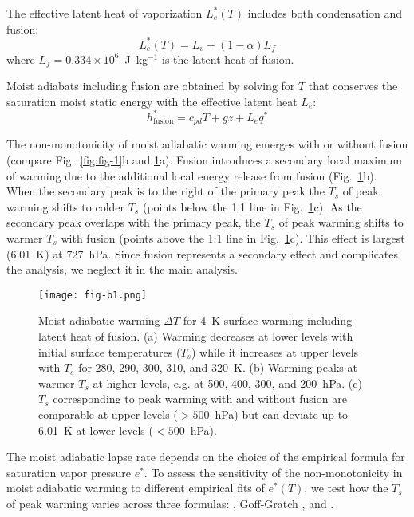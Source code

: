\documentclass[]{ametsocV6.1}
\begin{document}
The effective latent heat of vaporization $L_e^*(T)$ includes both condensation and fusion:
\begin{equation}
L_e^*(T) = L_v + (1-\alpha) L_f
\end{equation}
where $L_f = 0.334 \times 10^6$~J~kg$^{-1}$ is the latent heat of fusion.

Moist adiabats including fusion are obtained by solving for $T$ that conserves the saturation moist static energy with the effective latent heat $L_e$:
\begin{equation}
    h_\mathrm{fusion}^* = c_{pd}T + gz + L_e q^*  \label{eq:mse_fusion}
\end{equation}

The non-monotonicity of moist adiabatic warming emerges with or without fusion (compare Fig.~\ref{fig:fig-1}b and \ref{fig:fig-b1}a). Fusion introduces a secondary local maximum of warming due to the additional local energy release from fusion (Fig.~\ref{fig:fig-b1}b). When the secondary peak is to the right of the primary peak the $T_s$ of peak warming shifts to colder $T_s$ (points below the 1:1 line in Fig.~\ref{fig:fig-b1}c). As the secondary peak overlaps with the primary peak, the $T_s$ of peak warming shifts to warmer $T_s$ with fusion (points above the 1:1 line in Fig.~\ref{fig:fig-b1}c). This effect is largest (6.01~K) at 727~hPa. Since fusion represents a secondary effect and complicates the analysis, we neglect it in the main analysis.

\begin{figure}[htbp]
 \centering
 \texttt{[image: fig-b1.png]}
 \caption{Moist adiabatic warming $\Delta T$ for 4~K surface warming including latent heat of fusion. (a) Warming decreases at lower levels with initial surface temperatures ($T_s$) while it increases at upper levels with $T_s$ for 280, 290, 300, 310, and 320~K. (b) Warming peaks at warmer $T_s$ at higher levels, e.g. at 500, 400, 300, and 200~hPa. (c) $T_s$ corresponding to peak warming with and without fusion are comparable at upper levels ($>500$~hPa) but can deviate up to 6.01~K at lower levels ($<500$~hPa).}\label{fig:fig-b1}
\end{figure}

\appendix[C] 
\label{app:svp}
The moist adiabatic lapse rate depends on the choice of the empirical formula for saturation vapor pressure $e^*$. To assess the sensitivity of the non-monotonicity in moist adiabatic warming to different empirical fits of $e^*(T)$, we test how the $T_s$ of peak warming varies across three formulas: \cite{bolton1980}, Goff-Gratch \citep[as described in][]{list1949}, and \cite{murphy2005}.
\end{document}
